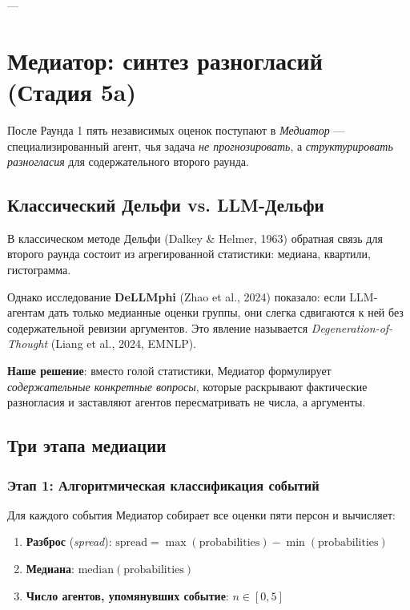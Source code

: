 ---


\section{Медиатор: синтез разногласий (Стадия 5a)}


После Раунда 1 пять независимых оценок поступают в \emph{Медиатор} — специализированный агент, чья задача \emph{не прогнозировать}, а \emph{структурировать разногласия} для содержательного второго раунда.

\subsection{Классический Дельфи vs. LLM-Дельфи}

В классическом методе Дельфи (Dalkey \& Helmer, 1963) обратная связь для второго раунда состоит из агрегированной статистики: медиана, квартили, гистограмма.

Однако исследование \textbf{DeLLMphi} (Zhao et al., 2024) показало: если LLM-агентам дать только медианные оценки группы, они слегка сдвигаются к ней без содержательной ревизии аргументов. Это явление называется \emph{Degeneration-of-Thought} (Liang et al., 2024, EMNLP).

\textbf{Наше решение}: вместо голой статистики, Медиатор формулирует \emph{содержательные конкретные вопросы}, которые раскрывают фактические разногласия и заставляют агентов пересматривать не числа, а аргументы.

\subsection{Три этапа медиации}

\subsubsection{Этап 1: Алгоритмическая классификация событий}

Для каждого события Медиатор собирает все оценки пяти персон и вычисляет:

\begin{enumerate}
    \item \textbf{Разброс} (\emph{spread}): $\text{spread} = \max(\text{probabilities}) - \min(\text{probabilities})$
    \item \textbf{Медиана}: $\text{median}(\text{probabilities})$
    \item \textbf{Число агентов, упомянувших событие}: $n \in [0, 5]$
\end{enumerate}


